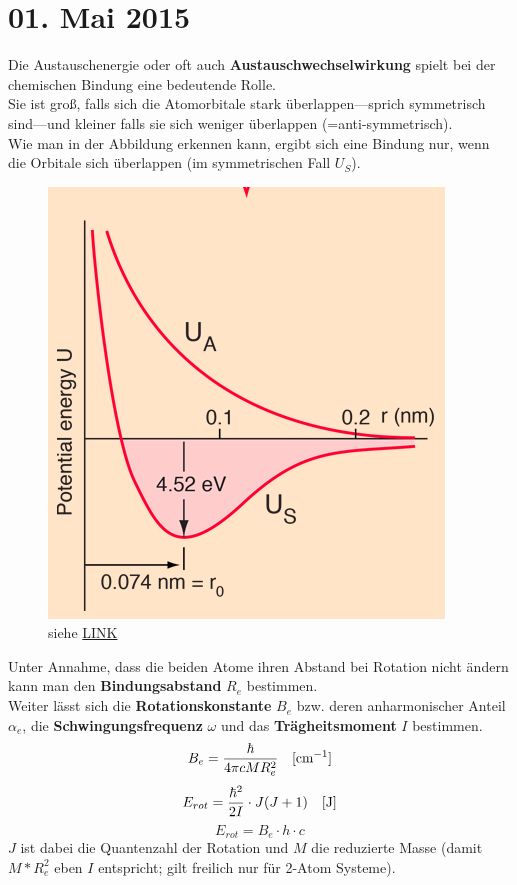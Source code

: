 \section{01. Mai 2015}
\label{q:1}

Die Austauschenergie oder oft auch \textbf{Austauschwechselwirkung} spielt bei der chemischen Bindung eine bedeutende Rolle. \\
Sie ist groß, falls sich die Atomorbitale stark überlappen---sprich symmetrisch sind---und kleiner falls sie sich weniger überlappen (=anti-symmetrisch). \\
Wie man in der Abbildung erkennen kann, ergibt sich eine Bindung nur, wenn die Orbitale sich überlappen (im symmetrischen Fall $U_S$). \\
\begin{figure}[H]  
    \centering
    \includegraphics[width=.4\textwidth]{resources/05-01-2015/Frage1.png}
    \caption{siehe \href{http://hyperphysics.phy-astr.gsu.edu/hbase/molecule/hmol.html}{LINK}}
\end{figure}

\label{q:2}

Unter Annahme, dass die beiden Atome ihren Abstand bei Rotation nicht ändern kann man den \textbf{Bindungsabstand} $R_e$ bestimmen. \\
Weiter lässt sich die \textbf{Rotationskonstante} $B_e$ bzw. deren anharmonischer Anteil $\alpha_e$, die \textbf{Schwingungsfrequenz} $\omega$ und das \textbf{Trägheitsmoment} $I$ bestimmen. \\

\[B_e = \frac{\hbar}{4 \pi c M R_e^2}\text{\quad [cm$^{-1}$]}\]
\[E_{rot} = \frac{\hbar^2}{2 I} \cdot J(J+1)\text{\quad [J]}\]
\[E_{rot} = B_e \cdot h\cdot c\]
$J$ ist dabei die Quantenzahl der Rotation und $M$ die reduzierte Masse (damit $M * R_e^2$ eben $I$ entspricht; gilt freilich nur für 2-Atom Systeme). \\

